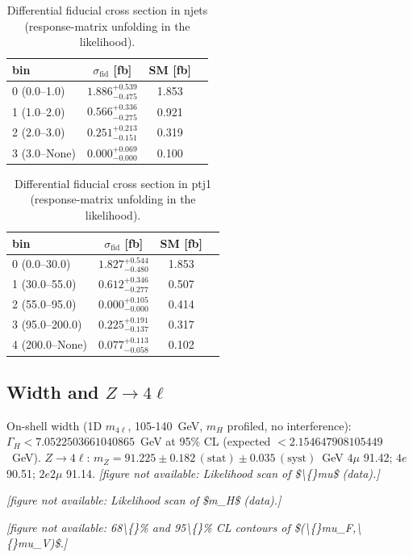 \documentclass[11pt,a4paper]{article}
\begin{document}
\begin{table}[H]\centering\small\caption{Differential fiducial cross section in njets (response-matrix unfolding in the likelihood).}\begin{tabular}{lccc}\toprule bin & $\sigma_{\text{fid}}$ [fb] & SM [fb]\\\midrule
0 (0.0--1.0) & $1.886^{+0.539}_{-0.475}$ & 1.853\\
1 (1.0--2.0) & $0.566^{+0.336}_{-0.275}$ & 0.921\\
2 (2.0--3.0) & $0.251^{+0.213}_{-0.151}$ & 0.319\\
3 (3.0--None) & $0.000^{+0.069}_{-0.000}$ & 0.100\\
\bottomrule\end{tabular}\end{table}
\begin{table}[H]\centering\small\caption{Differential fiducial cross section in ptj1 (response-matrix unfolding in the likelihood).}\begin{tabular}{lccc}\toprule bin & $\sigma_{\text{fid}}$ [fb] & SM [fb]\\\midrule
0 (0.0--30.0) & $1.827^{+0.544}_{-0.480}$ & 1.853\\
1 (30.0--55.0) & $0.612^{+0.346}_{-0.277}$ & 0.507\\
2 (55.0--95.0) & $0.000^{+0.105}_{-0.000}$ & 0.414\\
3 (95.0--200.0) & $0.225^{+0.191}_{-0.137}$ & 0.317\\
4 (200.0--None) & $0.077^{+0.113}_{-0.058}$ & 0.102\\
\bottomrule\end{tabular}\end{table}
\subsection{Width and $Z\to4\ell$}
On-shell width (1D $m_{4\ell}$, 105-140~GeV, $m_H$ profiled, no interference): $\Gamma_H<7.0522503661040865$~GeV at 95\% CL (expected $<2.154647908105449$~GeV).  $Z\to4\ell$: $m_Z=91.225\pm0.182\,(\text{stat})\pm0.035\,(\text{syst})$~GeV $4\mu$ 91.42; $4e$ 90.51; $2e2\mu$ 91.14.
\noindent\textit{[figure not available: Likelihood scan of \$\textbackslash\{\}mu\$ (data).]}

\noindent\textit{[figure not available: Likelihood scan of \$m\_H\$ (data).]}

\noindent\textit{[figure not available: 68\textbackslash\{\}\% and 95\textbackslash\{\}\% CL contours of \$(\textbackslash\{\}mu\_F,\textbackslash\{\}mu\_V)\$.]}
\end{document}
